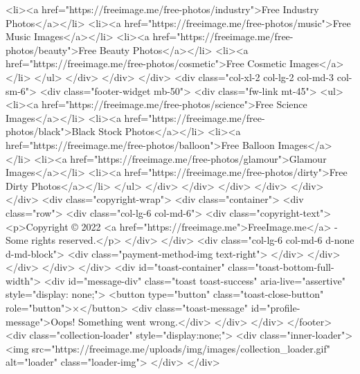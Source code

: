 <li><a href="https://freeimage.me/free-photos/industry">Free Industry Photos</a></li>
<li><a href="https://freeimage.me/free-photos/music">Free Music Images</a></li>
<li><a href="https://freeimage.me/free-photos/beauty">Free Beauty Photos</a></li>
<li><a href="https://freeimage.me/free-photos/cosmetic">Free Cosmetic Images</a></li>
</ul>
</div>
</div>
</div>
<div class="col-xl-2 col-lg-2 col-md-3 col-sm-6">
<div class="footer-widget mb-50">
<div class="fw-link mt-45">
<ul>
<li><a href="https://freeimage.me/free-photos/science">Free Science Images</a></li>
<li><a href="https://freeimage.me/free-photos/black">Black Stock Photos</a></li>
<li><a href="https://freeimage.me/free-photos/balloon">Free Balloon Images</a></li>
<li><a href="https://freeimage.me/free-photos/glamour">Glamour Images</a></li>
<li><a href="https://freeimage.me/free-photos/dirty">Free Dirty Photos</a></li>
</ul>
</div>
</div>
</div>
</div>
</div>
</div>
<div class="copyright-wrap">
<div class="container">
<div class="row">
<div class="col-lg-6 col-md-6">
<div class="copyright-text">
<p>Copyright © 2022 <a href="https://freeimage.me">FreeImage.me</a> - Some rights reserved.</p>
</div>
</div>
<div class="col-lg-6 col-md-6 d-none d-md-block">
<div class="payment-method-img text-right">
</div>
</div>
</div>
</div>
</div>
<div id="toast-container" class="toast-bottom-full-width">
<div id="message-div" class="toast toast-success" aria-live="assertive" style="display: none;">
<button type="button" class="toast-close-button" role="button">×</button>
<div class="toast-message" id="profile-message">Oops! Something went wrong.</div>
</div>
</div>
</footer>
<div class="collection-loader" style="display:none;">
<div class="inner-loader">
<img src="https://freeimage.me/uploads/img/images/collection_loader.gif" alt="loader" class="loader-img">
</div>
</div>


